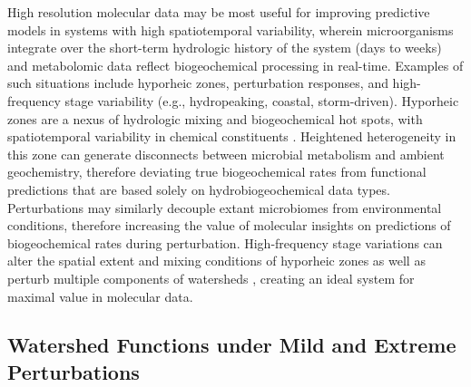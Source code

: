 \documentclass[preprint,review, 12pt]{elsarticle}
\begin{document}
High resolution molecular data may be most useful for improving predictive models in systems with high spatiotemporal variability, wherein microorganisms integrate over the short-term hydrologic history of the system (days to weeks) and metabolomic data reflect biogeochemical processing in real-time. Examples of such situations include hyporheic zones, perturbation responses, and high-frequency stage variability (e.g., hydropeaking, coastal, storm-driven). Hyporheic zones are a nexus of hydrologic mixing and biogeochemical hot spots, with spatiotemporal variability in chemical constituents \citep{Boulton1998, McClain2003, Harvey2015b}. Heightened heterogeneity in this zone can generate disconnects between microbial metabolism and ambient geochemistry, therefore deviating true biogeochemical rates from functional predictions that are based solely on hydrobiogeochemical data types. Perturbations may similarly decouple extant microbiomes from environmental conditions, therefore increasing the value of molecular insights on predictions of biogeochemical rates during perturbation. High-frequency stage variations can alter the spatial extent and mixing conditions of hyporheic zones as well as perturb multiple components of watersheds \citep{Song2018b,Shuai2019b}, creating an ideal system for maximal value in molecular data. 

\subsection{Watershed Functions under Mild and Extreme Perturbations }
        
\end{document}
